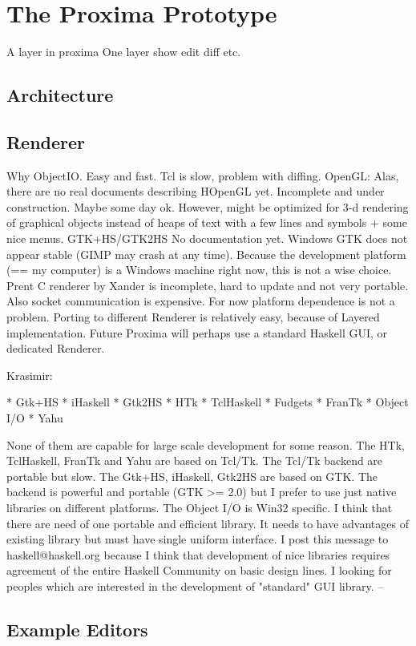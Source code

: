\chapter{The Proxima Prototype}
A layer in proxima
One layer
show edit diff etc. 
\section{Architecture}







\section{Renderer}
Why ObjectIO. 
Easy and fast.
Tcl is slow, problem with diffing. 
OpenGL: Alas, there are no real documents describing HOpenGL yet. Incomplete and under construction. Maybe some day ok. However, might be optimized for 3-d rendering of graphical objects instead of heaps of text with a few lines and symbols + some nice menus.
GTK+HS/GTK2HS No documentation yet. Windows GTK does not appear stable (GIMP may crash at any time). Because the development platform (== my computer) is a Windows machine right now, this is not a wise choice.
Prent C renderer by Xander is incomplete, hard to update and not very portable. Also socket communication is expensive.
For now platform dependence is not a problem.
Porting to different Renderer is relatively easy, because of Layered implementation.
Future Proxima will perhaps use a standard Haskell GUI, or dedicated Renderer.


Krasimir:

  * Gtk+HS
   * iHaskell
   * Gtk2HS
   * HTk
   * TclHaskell
   * Fudgets
   * FranTk
   * Object I/O
   * Yahu

None of them are capable for large scale development 
for some reason. The HTk, TclHaskell, FranTk and Yahu 
are based on Tcl/Tk. The Tcl/Tk backend are portable 
but slow. The Gtk+HS, iHaskell, Gtk2HS are based on
GTK. The backend is powerful and portable (GTK >= 2.0)
but I prefer to use just native libraries on 
different platforms. The Object I/O is Win32 specific.
I think that there are need of one portable and 
efficient library. It needs to have advantages of
existing library but must have single uniform
interface. I post this message to haskell@haskell.org 
because I think that development of nice libraries 
requires agreement of the entire Haskell Community on
basic design lines. I looking for peoples which are
interested in the development of "standard" GUI
library.
--

\section{Example Editors}
